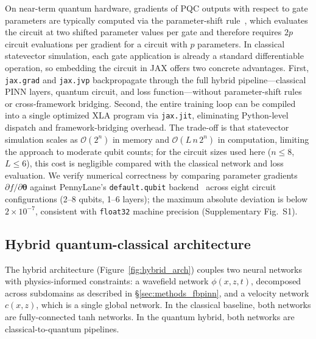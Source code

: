 On near-term quantum hardware, gradients of PQC outputs with respect to gate parameters are typically computed via the parameter-shift rule~, which evaluates the circuit at two shifted parameter values per gate and therefore requires $2p$ circuit evaluations per gradient for a circuit with $p$ parameters. In classical statevector simulation, each gate application is already a standard differentiable operation, so embedding the circuit in JAX offers two concrete advantages. First, \texttt{jax.grad} and \texttt{jax.jvp} backpropagate through the full hybrid pipeline---classical PINN layers, quantum circuit, and loss function---without parameter-shift rules or cross-framework bridging. Second, the entire training loop can be compiled into a single optimized XLA program via \texttt{jax.jit}, eliminating Python-level dispatch and framework-bridging overhead. The trade-off is that statevector simulation scales as $\mathcal{O}(2^n)$ in memory and $\mathcal{O}(L\,n\,2^n)$ in computation, limiting the approach to moderate qubit counts; for the circuit sizes used here ($n \leq 8$, $L \leq 6$), this cost is negligible compared with the classical network and loss evaluation. We verify numerical correctness by comparing parameter gradients $\partial f/\partial\boldsymbol{\theta}$ against PennyLane's \texttt{default.qubit} backend~ across eight circuit configurations (2--8 qubits, 1--6 layers); the maximum absolute deviation is below $2\times 10^{-7}$, consistent with \texttt{float32} machine precision (Supplementary Fig.~S1).

\subsection{Hybrid quantum-classical architecture}\label{sec:hybrid_network}




The hybrid architecture (Figure~\ref{fig:hybrid_arch}) couples two neural networks with physics-informed constraints: a wavefield network $\phi(x,z,t)$, decomposed across subdomains as described in \S\ref{sec:methods_fbpinn}, and a velocity network $c(x,z)$, which is a single global network. In the classical baseline, both networks are fully-connected tanh networks. In the quantum hybrid, both networks are classical-to-quantum pipelines.


